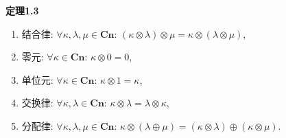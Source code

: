 \vspace{10pt}

\hypertarget{sec:定理1.3}{}
\noindent\textbf{定理1.3}

\begin{enumerate}
    \item 结合律: $\forall\kappa,\lambda,\mu\in\mathbf{Cn}:\,
    (\kappa\otimes\lambda)\otimes\mu=\kappa\otimes(\lambda\otimes\mu)$,
    \item 零元: $\forall\kappa\in\mathbf{Cn}:\,\kappa\otimes 0=0$,
    \item 单位元: $\forall\kappa\in\mathbf{Cn}:\,\kappa\otimes 1=\kappa$,
    \item 交换律: $\forall\kappa,\lambda\in\mathbf{Cn}:\,
    \kappa\otimes\lambda=\lambda\otimes\kappa$,
    \item 分配律: $\forall\kappa,\lambda,\mu\in\mathbf{Cn}:\,
    \kappa\otimes(\lambda\oplus\mu)=(\kappa\otimes\lambda)\oplus(\kappa\otimes\mu)$.
\end{enumerate}

